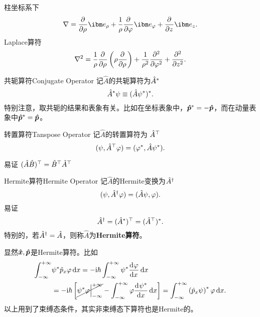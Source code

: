 	柱坐标系下
	\[
		\nabla=\pp\rho\ibm e_\rho+\frac1\rho\pp\varphi\ibm e_\varphi+\pp z\ibm e_z.
	\]
	Laplace算符
	\[
		\nabla^2=\frac1\rho\pp\rho\kh{\rho\pp\rho}+\frac1{\rho^2}\pp[2]\varphi+\pp[2]z.
	\]
\fi
\begin{definition}{共轭算符}{Conjugate Operator}
	记$\hat A$的共轭算符为$\hat A\cj$
	\[
		\hat A\cj\psi\equiv(\hat A\psi\cj)\cj.
	\]
	特别注意，取共轭的结果和表象有关。比如在坐标表象中，$\qo p\cj=-\qo p$，而在动量表象中$\qo p\cj=\qo p$。
\end{definition}
\begin{definition}{转置算符}{Tanspose Operator}
	记$\hat A$的转置算符为
	$\hat A\tp$
	\[
		(\psi,\hat A\tp\varphi)=(\varphi\cj,\hat A\psi\cj).
	\]
\end{definition}
易证
\((\hat A\hat B)\tp=\hat B\tp\hat A\tp\)
\begin{definition}{Hermite算符}{Hermite Operator}
	记$\hat A$的Hermite变换为$\hat A\dg$
	\[
		(\psi,\hat A\dg\varphi)=(\hat A\psi,\varphi).
	\]
	易证
	\[
		\hat A\dg=(\hat A\cj)\tp=(\hat A\tp)\cj.
	\]
	特别的，若$\hat A\dg=\hat A$，则称$\hat A$为\textbf{Hermite算符}。
\end{definition}
显然$\qo x,\qo p$是Hermite算符。比如
\begin{align*}
	\int\iti & \psi\cj\hat p_x\varphi\d x=-\i\hbar\int\iti\psi\cj\dv\varphi{x}\d x                                                                     \\
	         & =-\i\hbar\left[\cancel{\psi\cj\varphi{\Big\vert}\iti}-\int\iti\varphi\dv{\psi\cj}x\d x\right]=\int\iti\kh{\hat p_x\psi}\cj\varphi\d x.
\end{align*}
以上用到了束缚态条件，其实非束缚态下算符也是Hermite的。
